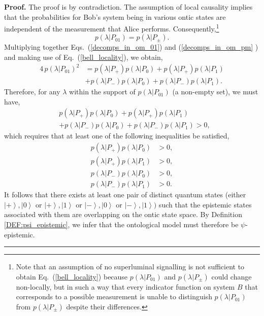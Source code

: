 \documentclass[aps,nofootinbib,12pt]{revtex4}
\newenvironment{proof}[1][Proof]{\noindent\textbf{#1.} }{\ \rule{0.5em}{0.5em}}
\begin{document}
\begin{proof}
The proof is by contradiction. The assumption of local causality
implies that the probabilities for Bob's system being in various
ontic states are independent of the measurement that Alice performs.
Consequently,\footnote{Note that an assumption of no superluminal
signalling is not sufficient to obtain Eq.~(\ref{bell_locality})
because $p(\lambda|P_{01})$ and $p(\lambda|P_{\pm})$ could change
non-locally, but in such a way that every indicator function on
system $B$ that corresponds to a possible measurement is unable to
distinguish $p(\lambda|P_{01})$ from $p(\lambda|P_{\pm})$ despite
their differences.}
\begin{equation}
p(\lambda|P_{01})=p(\lambda|P_{\pm}).\label{bell_locality}
\end{equation}
Multiplying together Eqs.~(\ref{decomps_in_om_01}) and (\ref{decomps_in_om_pm}%
) and making use of Eq.~(\ref{bell_locality}), we obtain,
\begin{align}
4\,p\left(\lambda|P_{01}\right)^{2} &= p\left(\lambda|P_{+}\right)
p\left(\lambda|P_{0}\right) + p\left(\lambda|P_{+}\right)
p\left(\lambda|P_{1}\right)
  \nonumber\\
& + p\left(\lambda|P_{-}\right)  p\left(\lambda|P_{0}\right)
+p\left(\lambda|P_{-}\right)  p\left(\lambda|P_{1}\right).
\end{align}
Therefore, for any $\lambda$ within the support of $p\left(  \lambda
|P_{01}\right)$ (a non-empty set), we must have,
\begin{align}
&  p\left(\lambda|P_{+}\right)  p\left(\lambda|P_{0}\right) +p\left(
\lambda|P_{+}\right)  p\left(\lambda|P_{1}\right)  \nonumber\\
&  +p\left(\lambda|P_{-}\right)  p\left(\lambda|P_{0}\right)
+p\left(\lambda|P_{-}\right)  p\left(\lambda|P_{1}\right)  >0,
\end{align}
which requires that at least one of the following inequalities be
satisfied,
\begin{align}
p\left(\lambda|P_{+}\right)  p\left(\lambda|P_{0}\right)   &
>0,\nonumber\\
p\left(\lambda|P_{+}\right)  p\left(\lambda|P_{1}\right)   &
>0,\nonumber\\
p\left(\lambda|P_{-}\right)  p\left(\lambda|P_{0}\right)   &
>0,\nonumber\\
p\left(\lambda|P_{-}\right)  p\left(\lambda|P_{1}\right)   &
>0.
\end{align}
It follows that there exists at least one pair of distinct quantum
states (either $\left\vert +\right\rangle ,\left\vert 0\right\rangle
$ or $\left\vert +\right\rangle ,\left\vert 1\right\rangle $ or
$\left\vert -\right\rangle ,\left\vert 0\right\rangle $ or
$\left\vert -\right\rangle ,\left\vert 1\right\rangle )$ such that
the epistemic states associated with them are overlapping on the
ontic state space. By Definition \ref{DEF:psi_epistemic}, we infer
that the ontological model must therefore be $\psi$-epistemic.
\end{proof}
\end{document}
